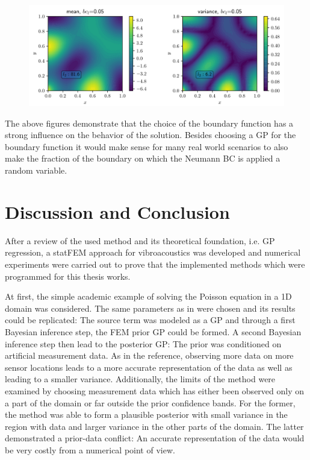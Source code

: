 \documentclass[%
  a4paper,oneside,%
  11pt,%
  smallchapters,
  style=printdev,
  extramargin,
  green,%
  rgb, <cmyk>
  ]{tubsbook}
\begin{document}
\begin{figure}[!ht]
\includegraphics[width=1\textwidth]{../../Python/Results/2D/VaryingSource/y_005/MeanVar.pdf}
\centering
\caption{}
\label{fig:varFieldPriorFlat005}
\end{figure}

The above figures demonstrate that the choice of the boundary function has a strong influence on the behavior of the solution. Besides choosing a GP for the boundary function it would make sense for many real world scenarios to also make the fraction of the boundary on which the Neumann BC is applied a random variable.


\chapter{Discussion and Conclusion}
After a review of the used method and its theoretical foundation, i.e. GP regression, a statFEM approach for vibroacoustics was developed and numerical experiments were carried out to prove that the implemented methods which were programmed for this thesis works. 

At first, the simple academic example of solving the Poisson equation in a 1D domain was considered. The same parameters as in \cite{girolami2021} were chosen and its results could be replicated: The source term was modeled as a GP and through a first Bayesian inference step, the FEM prior GP could be formed. A second Bayesian inference step then lead to the posterior GP: The prior was conditioned on artificial measurement data. As in the reference, observing more data on more sensor locations leads to a more accurate representation of the data as well as leading to a smaller variance. Additionally, the limits of the method were examined by choosing measurement data which has either been observed only on a part of the domain or far outside the prior confidence bands. For the former, the method was able to form a plausible posterior with small variance in the region with data and larger variance in the other parts of the domain. The latter demonstrated a prior-data conflict: An accurate representation of the data would be very costly from a numerical point of view.
\end{document}
